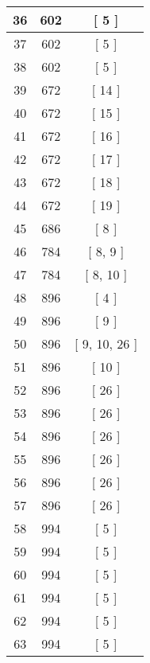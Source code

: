 \begin{center}
\begin{longtable}[H]{|| c c c ||}
36 & 602 & [ 5 ] \\ 
\hline
37 & 602 & [ 5 ] \\ 
\hline
38 & 602 & [ 5 ] \\ 
\hline
39 & 672 & [ 14 ] \\ 
\hline
40 & 672 & [ 15 ] \\ 
\hline
41 & 672 & [ 16 ] \\ 
\hline
42 & 672 & [ 17 ] \\ 
\hline
43 & 672 & [ 18 ] \\ 
\hline
44 & 672 & [ 19 ] \\ 
\hline
45 & 686 & [ 8 ] \\ 
\hline
46 & 784 & [ 8, 9 ] \\ 
\hline
47 & 784 & [ 8, 10 ] \\ 
\hline
48 & 896 & [ 4 ] \\ 
\hline
49 & 896 & [ 9 ] \\ 
\hline
50 & 896 & [ 9, 10, 26 ] \\ 
\hline
51 & 896 & [ 10 ] \\ 
\hline
52 & 896 & [ 26 ] \\ 
\hline
53 & 896 & [ 26 ] \\ 
\hline
54 & 896 & [ 26 ] \\ 
\hline
55 & 896 & [ 26 ] \\ 
\hline
56 & 896 & [ 26 ] \\ 
\hline
57 & 896 & [ 26 ] \\ 
\hline
58 & 994 & [ 5 ] \\ 
\hline
59 & 994 & [ 5 ] \\ 
\hline
60 & 994 & [ 5 ] \\ 
\hline
61 & 994 & [ 5 ] \\ 
\hline
62 & 994 & [ 5 ] \\ 
\hline
63 & 994 & [ 5 ] \\ 
\hline
\end{longtable}
\end{center}
